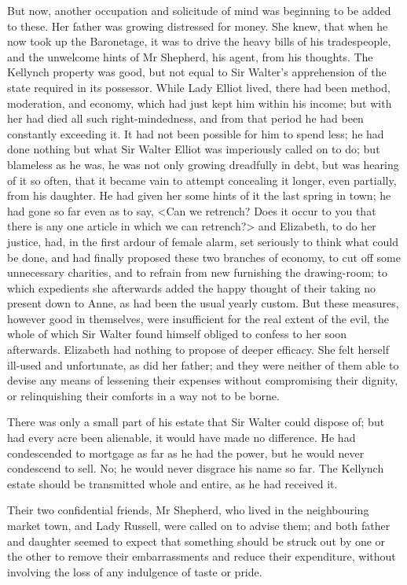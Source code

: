 But now, another occupation and solicitude of mind was beginning to be added to these. Her father was growing distressed for money. She knew, that when he now took up the Baronetage, it was to drive the heavy bills of his tradespeople, and the unwelcome hints of Mr Shepherd, his agent, from his thoughts. The Kellynch property was good, but not equal to Sir Walter's apprehension of the state required in its possessor. While Lady Elliot lived, there had been method, moderation, and economy, which had just kept him within his income; but with her had died all such right-mindedness, and from that period he had been constantly exceeding it. It had not been possible for him to spend less; he had done nothing but what Sir Walter Elliot was imperiously called on to do; but blameless as he was, he was not only growing dreadfully in debt, but was hearing of it so often, that it became vain to attempt concealing it longer, even partially, from his daughter. He had given her some hints of it the last spring in town; he had gone so far even as to say, <Can we retrench? Does it occur to you that there is any one article in which we can retrench?> and Elizabeth, to do her justice, had, in the first ardour of female alarm, set seriously to think what could be done, and had finally proposed these two branches of economy, to cut off some unnecessary charities, and to refrain from new furnishing the drawing-room; to which expedients she afterwards added the happy thought of their taking no present down to Anne, as had been the usual yearly custom. But these measures, however good in themselves, were insufficient for the real extent of the evil, the whole of which Sir Walter found himself obliged to confess to her soon afterwards. Elizabeth had nothing to propose of deeper efficacy. She felt herself ill-used and unfortunate, as did her father; and they were neither of them able to devise any means of lessening their expenses without compromising their dignity, or relinquishing their comforts in a way not to be borne.

There was only a small part of his estate that Sir Walter could dispose of; but had every acre been alienable, it would have made no difference. He had condescended to mortgage as far as he had the power, but he would never condescend to sell. No; he would never disgrace his name so far. The Kellynch estate should be transmitted whole and entire, as he had received it.

Their two confidential friends, Mr Shepherd, who lived in the neighbouring market town, and Lady Russell, were called on to advise them; and both father and daughter seemed to expect that something should be struck out by one or the other to remove their embarrassments and reduce their expenditure, without involving the loss of any indulgence of taste or pride.